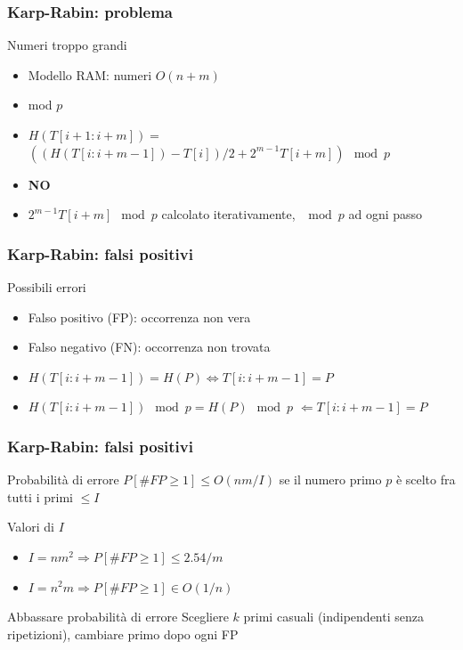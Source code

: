 \begin{frame}[fragile]
\frametitle{Karp-Rabin: problema}
\begin{block}{Numeri troppo grandi}
\begin{itemize}
\item
Modello RAM: numeri $O(n+m)$
\item
mod $p$
\item
$H(T[i+1:i+m]) =$\\
$\left(\left(H(T[i:i+m-1]) - T[i] \right) / 2 + 2^{m-1}T[i+m] \right)\mod p$
\item \textbf{NO}
\item
$2^{m-1}T[i+m] \mod p$ calcolato iterativamente, $\mod p$ ad ogni passo
\end{itemize}
\end{block}
\end{frame}

\begin{frame}[fragile]
\frametitle{Karp-Rabin: falsi positivi}
\begin{block}{Possibili errori}
\begin{itemize}
\item
Falso positivo (FP): occorrenza non vera
\item
Falso negativo (FN): occorrenza non trovata
\item
$H(T[i:i+m-1])=H(P) \Leftrightarrow T[i:i+m-1]=P$
\item
$H(T[i:i+m-1])  \mod p = H(P)  \mod p$
$\Leftarrow T[i:i+m-1]=P$
\end{itemize}
\end{block}
\end{frame}


\begin{frame}[fragile]
\frametitle{Karp-Rabin: falsi positivi}
\begin{block}{Probabilità di errore}
$P[\#FP\ge 1] \le O(nm/I)$ se il numero primo $p$ è scelto fra tutti i primi $\le
I$
\end{block}

\begin{block}{Valori di $I$}
\begin{itemize}
\item
$I=nm^{2} \Rightarrow P[\#FP\ge 1] \le 2.54/m$
\item
$I=n^{2}m  \Rightarrow P[\#FP\ge 1] \in O(1/n)$
\end{itemize}
\end{block}

\begin{block}{Abbassare probabilità di errore}
Scegliere $k$ primi casuali (indipendenti senza ripetizioni), cambiare primo
dopo ogni FP
\end{block}
\end{frame}

